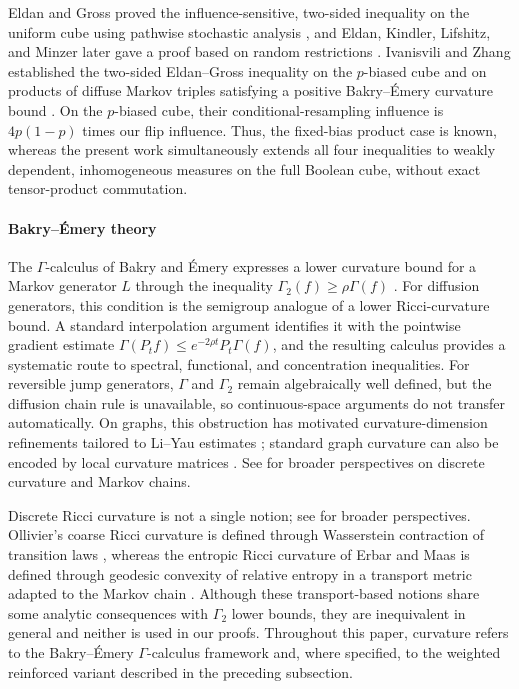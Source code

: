 Eldan and Gross proved the influence-sensitive, two-sided inequality on the uniform cube using pathwise stochastic analysis \cite{EldanGross22}, and Eldan, Kindler, Lifshitz, and Minzer later gave a proof based on random restrictions \cite{EldanKindlerLifshitzMinzer25}. Ivanisvili and Zhang established the two-sided Eldan--Gross inequality on the $p$-biased cube and on products of diffuse Markov triples satisfying a positive Bakry--\'Emery curvature bound \cite{IvanisviliZhang26}. On the $p$-biased cube, their conditional-resampling influence is $4p(1-p)$ times our flip influence. Thus, the fixed-bias product case is known, whereas the present work simultaneously extends all four inequalities to weakly dependent, inhomogeneous measures on the full Boolean cube, without exact tensor-product commutation.

\paragraph{Bakry--\'Emery theory}
The $\Gamma$-calculus of Bakry and \'Emery expresses a lower curvature bound for a Markov generator $L$ through the inequality $\Gamma_2(f) \geq \rho \Gamma(f)$ \cite{BakryEmery85,BGL-book}. For diffusion generators, this condition is the semigroup analogue of a lower Ricci-curvature bound. A standard interpolation argument identifies it with the pointwise gradient estimate $\Gamma(P_t f) \leq e^{-2\rho t} P_t\Gamma(f)$, and the resulting calculus provides a systematic route to spectral, functional, and concentration inequalities. For reversible jump generators, $\Gamma$ and $\Gamma_2$ remain algebraically well defined, but the diffusion chain rule is unavailable, so continuous-space arguments do not transfer automatically. On graphs, this obstruction has motivated curvature-dimension refinements tailored to Li--Yau estimates \cite{BHLLMY15}; standard graph curvature can also be encoded by local curvature matrices \cite{CKLP22}. See \cite{Kamtue-thesis,Salez-survey} for broader perspectives on discrete curvature and Markov chains.

Discrete Ricci curvature is not a single notion; see \cite{NR-book,Kamtue-thesis} for broader perspectives. Ollivier's coarse Ricci curvature is defined through Wasserstein contraction of transition laws \cite{Ollivier09}, whereas the entropic Ricci curvature of Erbar and Maas is defined through geodesic convexity of relative entropy in a transport metric adapted to the Markov chain \cite{ErbarMaas12}. Although these transport-based notions share some analytic consequences with $\Gamma_2$ lower bounds, they are inequivalent in general and neither is used in our proofs. Throughout this paper, curvature refers to the Bakry--\'Emery $\Gamma$-calculus framework and, where specified, to the weighted reinforced variant described in the preceding subsection.
